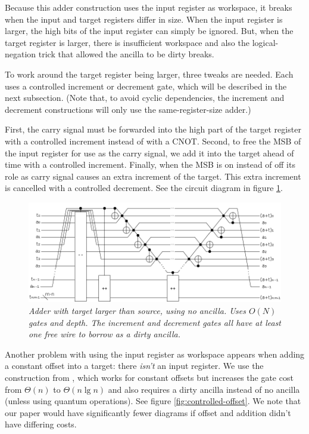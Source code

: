 \documentclass[twocolumn]{article}
\begin{document}
Because this adder construction uses the input register as workspace, it breaks when the input and target registers differ in size.
When the input register is larger, the high bits of the input register can simply be ignored.
But, when the target register is larger, there is insufficient workspace and also the logical-negation trick that allowed the ancilla to be dirty breaks.

To work around the target register being larger, three tweaks are needed.
Each uses a controlled increment or decrement gate, which will be described in the next subsection.
(Note that, to avoid cyclic dependencies, the increment and decrement constructions will only use the same-register-size adder.)

First, the carry signal must be forwarded into the high part of the target register with a controlled increment instead of with a CNOT.
Second, to free the MSB of the input register for use as the carry signal, we add it into the target ahead of time with a controlled increment.
Finally, when the MSB is on instead of off its role as carry signal causes an extra increment of the target.
This extra increment is cancelled with a controlled decrement.
See the circuit diagram in figure \ref{fig:inline-adder-into-large}.

\begin{figure}
  \centering
  \includegraphics[width=\linewidth]{assets/inline-adder-into-large.png}
  \caption{\em
      Adder with target larger than source, using no ancilla.
      Uses $O(N)$ gates and depth.
      The increment and decrement gates all have at least one free wire to borrow as a dirty ancilla.}
  \label{fig:inline-adder-into-large}
\end{figure}

Another problem with using the input register as workspace appears when adding a constant offset into a target: there {\em isn't} an input register.
We use the construction from \cite{haner2016}, which works for constant offsets but increases the gate cost from $\Theta(n)$ to $\Theta(n \lg n)$ and also requires a dirty ancilla instead of no ancilla (unless using quantum operations).
See figure \ref{fig:controlled-offset}.
We note that our paper would have significantly fewer diagrams if offset and addition didn't have differing costs.
\end{document}
